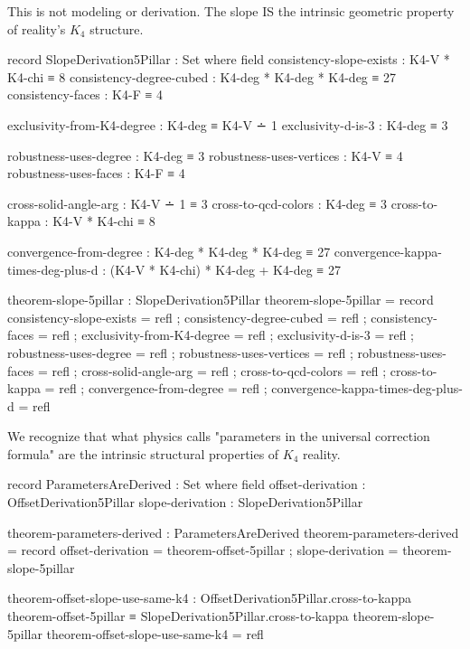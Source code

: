 \documentclass[11pt,a4paper]{book}
\begin{document}
This is not modeling or derivation. The slope IS the intrinsic geometric property of reality's $K_4$ structure.

\begin{code}
record SlopeDerivation5Pillar : Set where
  field
    consistency-slope-exists : K4-V * K4-chi ≡ 8
    consistency-degree-cubed : K4-deg * K4-deg * K4-deg ≡ 27
    consistency-faces : K4-F ≡ 4
    
    exclusivity-from-K4-degree : K4-deg ≡ K4-V ∸ 1
    exclusivity-d-is-3 : K4-deg ≡ 3
    
    robustness-uses-degree : K4-deg ≡ 3
    robustness-uses-vertices : K4-V ≡ 4
    robustness-uses-faces : K4-F ≡ 4
    
    cross-solid-angle-arg : K4-V ∸ 1 ≡ 3
    cross-to-qcd-colors : K4-deg ≡ 3
    cross-to-kappa : K4-V * K4-chi ≡ 8
    
    convergence-from-degree : K4-deg * K4-deg * K4-deg ≡ 27
    convergence-kappa-times-deg-plus-d : (K4-V * K4-chi) * K4-deg + K4-deg ≡ 27

theorem-slope-5pillar : SlopeDerivation5Pillar
theorem-slope-5pillar = record
  { consistency-slope-exists = refl
  ; consistency-degree-cubed = refl
  ; consistency-faces = refl
  ; exclusivity-from-K4-degree = refl
  ; exclusivity-d-is-3 = refl
  ; robustness-uses-degree = refl
  ; robustness-uses-vertices = refl
  ; robustness-uses-faces = refl
  ; cross-solid-angle-arg = refl
  ; cross-to-qcd-colors = refl
  ; cross-to-kappa = refl
  ; convergence-from-degree = refl
  ; convergence-kappa-times-deg-plus-d = refl
  }
\end{code}

We recognize that what physics calls "parameters in the universal correction formula" are the intrinsic structural properties of $K_4$ reality.

\begin{code}
record ParametersAreDerived : Set where
  field
    offset-derivation : OffsetDerivation5Pillar
    slope-derivation : SlopeDerivation5Pillar

theorem-parameters-derived : ParametersAreDerived
theorem-parameters-derived = record
  { offset-derivation = theorem-offset-5pillar
  ; slope-derivation = theorem-slope-5pillar
  }

theorem-offset-slope-use-same-k4 : 
  OffsetDerivation5Pillar.cross-to-kappa theorem-offset-5pillar ≡ 
  SlopeDerivation5Pillar.cross-to-kappa theorem-slope-5pillar
theorem-offset-slope-use-same-k4 = refl

\end{code}
\end{document}
